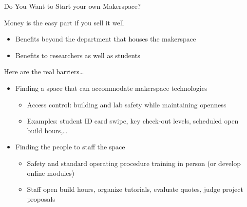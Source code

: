 \documentclass[xcolor=table,compress,professionalfonts,pdfpagelabels]{beamer}
\begin{document}
\begin{frame}{Do You Want to Start your own Makerspace?}
 \begin{block}{Money is the easy part if you sell it well}
  \begin{itemize}
   \item Benefits beyond the department that houses the makerspace
   \item Benefits to researchers as well as students
  \end{itemize}
 \end{block}
 \begin{block}{Here are the real barriers\ldots}
  \begin{itemize}
   \item Finding a \alert{space} that can accommodate makerspace technologies
   \begin{itemize}
    \item Access control: building and lab safety while maintaining openness
    \item Examples: student ID card swipe, key check-out levels, scheduled open build hours,\ldots
   \end{itemize}
   \item Finding the \alert{people} to staff the space
   \begin{itemize}
    \item Safety and standard operating procedure training in person (or develop online modules)
    \item Staff open build hours, organize tutorials, evaluate quotes, judge project proposals
   \end{itemize}
  \end{itemize}
 \end{block}
\end{frame}

\end{document}
